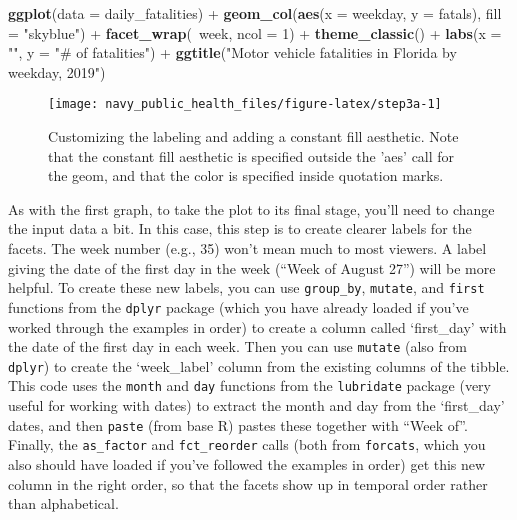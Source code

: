 \documentclass[]{tufte-book}
\newenvironment{Shaded}{}{}
\newcommand{\DataTypeTok}[1]{\textcolor[rgb]{0.56,0.13,0.00}{#1}}
\newcommand{\DecValTok}[1]{\textcolor[rgb]{0.25,0.63,0.44}{#1}}
\newcommand{\KeywordTok}[1]{\textcolor[rgb]{0.00,0.44,0.13}{\textbf{#1}}}
\newcommand{\NormalTok}[1]{#1}
\newcommand{\OperatorTok}[1]{\textcolor[rgb]{0.40,0.40,0.40}{#1}}
\newcommand{\StringTok}[1]{\textcolor[rgb]{0.25,0.44,0.63}{#1}}
\begin{document}
\begin{Shaded}
\begin{Highlighting}[]
\KeywordTok{ggplot}\NormalTok{(}\DataTypeTok{data =}\NormalTok{ daily_fatalities) }\OperatorTok{+}\StringTok{ }\KeywordTok{geom_col}\NormalTok{(}\KeywordTok{aes}\NormalTok{(}\DataTypeTok{x =}\NormalTok{ weekday, }
    \DataTypeTok{y =}\NormalTok{ fatals), }\DataTypeTok{fill =} \StringTok{"skyblue"}\NormalTok{) }\OperatorTok{+}\StringTok{ }\KeywordTok{facet_wrap}\NormalTok{(}\OperatorTok{~}\NormalTok{week, }
    \DataTypeTok{ncol =} \DecValTok{1}\NormalTok{) }\OperatorTok{+}\StringTok{ }\KeywordTok{theme_classic}\NormalTok{() }\OperatorTok{+}\StringTok{ }\KeywordTok{labs}\NormalTok{(}\DataTypeTok{x =} \StringTok{""}\NormalTok{, }
    \DataTypeTok{y =} \StringTok{"# of fatalities"}\NormalTok{) }\OperatorTok{+}\StringTok{ }\KeywordTok{ggtitle}\NormalTok{(}\StringTok{"Motor vehicle fatalities in Florida by weekday, 2019"}\NormalTok{)}
\end{Highlighting}
\end{Shaded}

\begin{figure}
\texttt{[image: navy\_public\_health\_files/figure-latex/step3a-1]} \caption[Customizing the labeling and adding a constant fill aesthetic]{Customizing the labeling and adding a constant fill aesthetic. Note that the constant fill aesthetic is specified outside the 'aes' call for the geom, and that the color is specified inside quotation marks.}\label{fig:step3a}
\end{figure}

As with the first graph, to take the plot to its final stage, you'll need to
change the input data a bit. In this case, this step is to create clearer labels for
the facets. The week number (e.g., 35) won't mean much to most viewers. A label giving
the date of the first day in the week (``Week of August 27'') will be more helpful.
To create these new labels, you can use \texttt{group\_by}, \texttt{mutate}, and \texttt{first} functions
from the \texttt{dplyr} package (which you have already loaded if you've worked through
the examples in order) to create a column called `first\_day' with the date of the
first day in each week. Then you can use \texttt{mutate} (also from \texttt{dplyr}) to create the
`week\_label' column from the existing columns of the tibble. This code uses the
\texttt{month} and \texttt{day} functions from the \texttt{lubridate} package (very useful for
working with dates) \citep{R-lubridate} to extract the month and day from the `first\_day'
dates, and then \texttt{paste} (from base R) pastes these together with ``Week of''.
Finally, the \texttt{as\_factor} and \texttt{fct\_reorder} calls (both from \texttt{forcats}, which you
also should have loaded if you've followed the examples in order) get this new
column in the right order, so that the facets show up in temporal order rather
than alphabetical.
\end{document}
